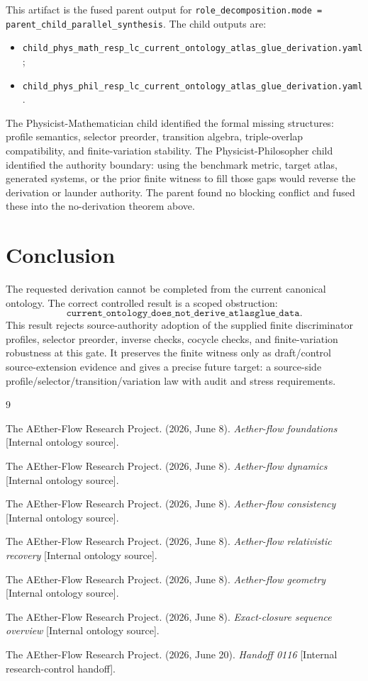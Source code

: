 \documentclass[11pt]{article}
\begin{document}
This artifact is the fused parent output for
\texttt{role\_decomposition.mode = parent\_child\_parallel\_synthesis}. The
child outputs are:
\begin{itemize}
  \item \texttt{child\_phys\_math\_resp\_lc\_current\_ontology\_atlas\_glue\_derivation.yaml};
  \item \texttt{child\_phys\_phil\_resp\_lc\_current\_ontology\_atlas\_glue\_derivation.yaml}.
\end{itemize}

The Physicist-Mathematician child identified the formal missing structures:
profile semantics, selector preorder, transition algebra, triple-overlap
compatibility, and finite-variation stability. The Physicist-Philosopher
child identified the authority boundary: using the benchmark metric, target
atlas, generated systems, or the prior finite witness to fill those gaps would
reverse the derivation or launder authority. The parent found no blocking
conflict and fused these into the no-derivation theorem above.

\section{Conclusion}

The requested derivation cannot be completed from the current canonical
ontology. The correct controlled result is a scoped obstruction:
\[
  \texttt{current\_ontology\_does\_not\_derive\_atlasglue\_data}.
\]
This result rejects source-authority adoption of the supplied finite
discriminator profiles, selector preorder, inverse checks, cocycle checks, and
finite-variation robustness at this gate. It preserves the finite witness only
as draft/control source-extension evidence and gives a precise future target:
a source-side profile/selector/transition/variation law with audit and stress
requirements.

\begin{thebibliography}{9}

The AEther-Flow Research Project. (2026, June 8). \emph{Aether-flow
foundations} [Internal ontology source].

The AEther-Flow Research Project. (2026, June 8). \emph{Aether-flow dynamics}
[Internal ontology source].

The AEther-Flow Research Project. (2026, June 8). \emph{Aether-flow
consistency} [Internal ontology source].

The AEther-Flow Research Project. (2026, June 8). \emph{Aether-flow
relativistic recovery} [Internal ontology source].

The AEther-Flow Research Project. (2026, June 8). \emph{Aether-flow geometry}
[Internal ontology source].

The AEther-Flow Research Project. (2026, June 8). \emph{Exact-closure
sequence overview} [Internal ontology source].

The AEther-Flow Research Project. (2026, June 20). \emph{Handoff 0116}
[Internal research-control handoff].

\end{thebibliography}
\end{document}
